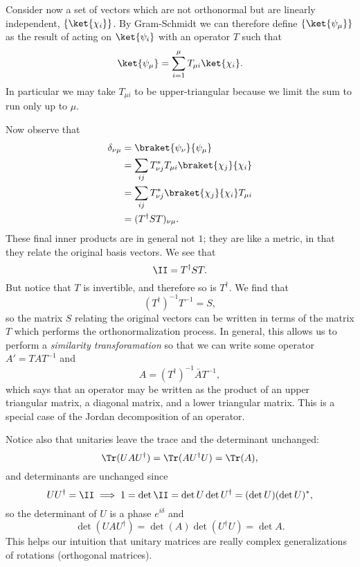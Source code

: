 Consider now a set of vectors which are not orthonormal but are linearly independent, $\set{\ket{\chi_i}}$. By Gram-Schmidt we can therefore define $\set{\ket{\psi_\mu}}$ as the result of acting on $\ket{\psi_i}$ with an operator $T$ such that
\begin{equation}
	\ket{\psi_\mu} = \sum_{i=1}^\mu T_{\mu i} \ket{\chi_i}.
\end{equation}
In particular we may take $T_{\mu i}$ to be upper-triangular because we limit the sum to run only up to $\mu$.	

Now observe that
\begin{align*}
	\delta_{\nu\mu} &= \braket{\psi_\nu}{\psi_\mu}\\
		&= \sum_{ij} T_{\nu j}^* T_{\mu i} \braket{\chi_j}{\chi_i}\\
		&= \sum_{ij} T_{\nu j}^* \braket{\chi_j}{\chi_i} T_{\mu i}\\
		&= (T^\dagger S T)_{\nu\mu}.
\end{align*}
These final inner products are in general not $1$; they are like a metric, in that they relate the original basis vectors. We see that
\begin{equation}
	\II = T^\dagger S T.
\end{equation}
But notice that $T$ is invertible, and therefore so is $T^\dagger$. We find that
\begin{equation}
	(T^{\dagger})^{-1} T^{-1} = S,
\end{equation}
so the matrix $S$ relating the original vectors can be written in terms of the matrix $T$ which performs the orthonormalization process. In general, this allows us to perform a \emph{similarity transforamation} so that we can write some operator $A'=TAT^{-1}$ and
\begin{equation}
	A= (T^\dagger)^{-1} \bar A T^{-1},
\end{equation}
which says that an operator may be written as the product of an upper triangular matrix, a diagonal matrix, and a lower triangular matrix. This is a special case of the Jordan decomposition of an operator.

Notice also that unitaries leave the trace and the determinant unchanged:
\begin{equation}
	\Tr(UAU^\dagger)=\Tr(AU^\dagger U) = \Tr(A),
\end{equation}
and determinants are unchanged since
\begin{equation}
	UU^\dagger = \II \implies 1 = \det \II = \det U \det U^\dagger = (\det U)(\det U)^*,
\end{equation}
so the determinant of $U$ is a phase $e^{i\delta}$ and
\begin{equation}
	\det(UAU^\dagger)=\det(A) \det(U^\dagger U) = \det A.
\end{equation}
This helps our intuition that unitary matrices are really complex generalizations of rotations (orthogonal matrices).

